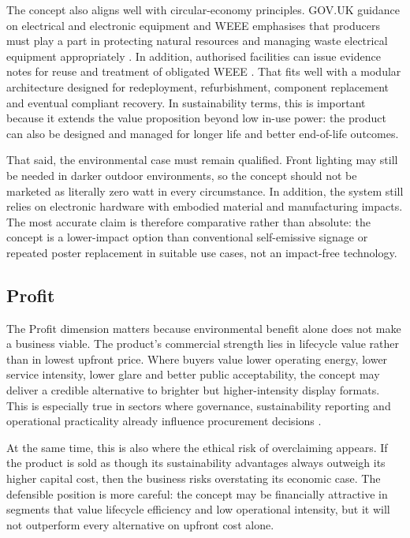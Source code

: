 \documentclass[11pt,a4paper]{article}
\begin{document}
The concept also aligns well with circular-economy principles. GOV.UK guidance on electrical and electronic equipment and WEEE emphasises that producers must play a part in protecting natural resources and managing waste electrical equipment appropriately \cite{ref21}. In addition, authorised facilities can issue evidence notes for reuse and treatment of obligated WEEE \cite{ref22}. That fits well with a modular architecture designed for redeployment, refurbishment, component replacement and eventual compliant recovery. In sustainability terms, this is important because it extends the value proposition beyond low in-use power: the product can also be designed and managed for longer life and better end-of-life outcomes.

That said, the environmental case must remain qualified. Front lighting may still be needed in darker outdoor environments, so the concept should not be marketed as literally zero watt in every circumstance. In addition, the system still relies on electronic hardware with embodied material and manufacturing impacts. The most accurate claim is therefore comparative rather than absolute: the concept is a lower-impact option than conventional self-emissive signage or repeated poster replacement in suitable use cases, not an impact-free technology.

\subsection{Profit}

The Profit dimension matters because environmental benefit alone does not make a business viable. The product's commercial strength lies in lifecycle value rather than in lowest upfront price. Where buyers value lower operating energy, lower service intensity, lower glare and better public acceptability, the concept may deliver a credible alternative to brighter but higher-intensity display formats. This is especially true in sectors where governance, sustainability reporting and operational practicality already influence procurement decisions \cite{ref6}\cite{ref4}.

At the same time, this is also where the ethical risk of overclaiming appears. If the product is sold as though its sustainability advantages always outweigh its higher capital cost, then the business risks overstating its economic case. The defensible position is more careful: the concept may be financially attractive in segments that value lifecycle efficiency and low operational intensity, but it will not outperform every alternative on upfront cost alone.
\end{document}
